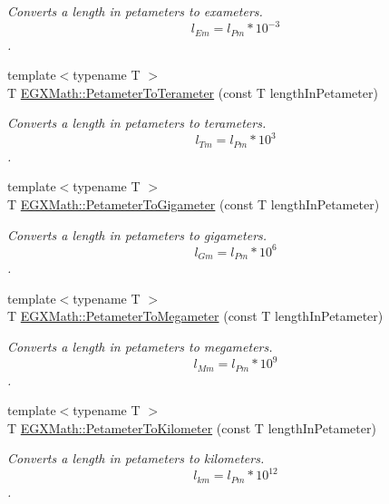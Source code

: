 \begin{DoxyCompactItemize}
\begin{DoxyCompactList}\small\item\em Converts a length in petameters to exameters. \[ l_{Em}=l_{Pm} * 10^{-3} \]. \end{DoxyCompactList}\item 
{\footnotesize template$<$typename T $>$ }\\T \mbox{\hyperlink{group___e_g_x_math-_conversions-_length_conversions-_petameter-_s_i_ga49df669a2666aa9681c907ea80e4c34c}{E\+G\+X\+Math\+::\+Petameter\+To\+Terameter}} (const T length\+In\+Petameter)
\begin{DoxyCompactList}\small\item\em Converts a length in petameters to terameters. \[ l_{Tm}=l_{Pm} * 10^{3} \]. \end{DoxyCompactList}\item 
{\footnotesize template$<$typename T $>$ }\\T \mbox{\hyperlink{group___e_g_x_math-_conversions-_length_conversions-_petameter-_s_i_ga421403e7220de552c73ae8e3e1edefd1}{E\+G\+X\+Math\+::\+Petameter\+To\+Gigameter}} (const T length\+In\+Petameter)
\begin{DoxyCompactList}\small\item\em Converts a length in petameters to gigameters. \[ l_{Gm}=l_{Pm} * 10^{6} \]. \end{DoxyCompactList}\item 
{\footnotesize template$<$typename T $>$ }\\T \mbox{\hyperlink{group___e_g_x_math-_conversions-_length_conversions-_petameter-_s_i_gabee8390ae6476b4718cf82fc87ae7a1e}{E\+G\+X\+Math\+::\+Petameter\+To\+Megameter}} (const T length\+In\+Petameter)
\begin{DoxyCompactList}\small\item\em Converts a length in petameters to megameters. \[ l_{Mm}=l_{Pm} * 10^{9} \]. \end{DoxyCompactList}\item 
{\footnotesize template$<$typename T $>$ }\\T \mbox{\hyperlink{group___e_g_x_math-_conversions-_length_conversions-_petameter-_s_i_gadf5a6ef57468284f06662fd7c59ad5ee}{E\+G\+X\+Math\+::\+Petameter\+To\+Kilometer}} (const T length\+In\+Petameter)
\begin{DoxyCompactList}\small\item\em Converts a length in petameters to kilometers. \[ l_{km}=l_{Pm} * 10^{12} \]. \end{DoxyCompactList}\item 

\end{DoxyCompactItemize}
